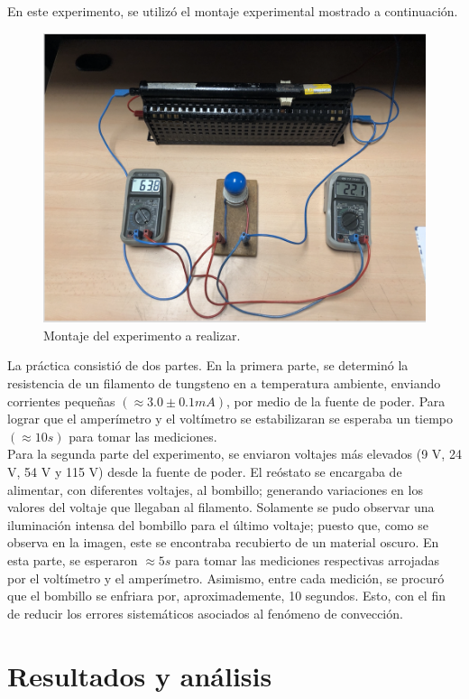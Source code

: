 \documentclass[%
 reprint,
 amsmath,amssymb,
 aps,
]{revtex4-1}
\begin{document}
En este experimento, se utilizó el montaje experimental mostrado a continuación.
\begin{figure}[H]
    \centering
    \includegraphics[scale= 0.4]{montaje_lab1.png}
    \caption{Montaje del experimento a realizar.}
    \label{fig:Figura 3}
\end{figure}

La práctica consistió de dos partes. En la primera parte, se determinó la resistencia de un filamento de tungsteno en a temperatura ambiente, enviando corrientes pequeñas $(\approx 3.0 \pm 0.1 mA)$, por medio de la fuente de poder. Para lograr que el amperímetro y el voltímetro se estabilizaran se esperaba un tiempo $(\approx 10 s)$ para tomar las mediciones. \\
Para la segunda parte del experimento, se enviaron voltajes más elevados (9 V, 24 V, 54 V y 115 V) desde la fuente de poder. El reóstato se encargaba de alimentar, con diferentes voltajes, al bombillo; generando variaciones en los valores del voltaje que llegaban al filamento. Solamente se pudo observar una iluminación intensa del bombillo para el último voltaje; puesto que, como se observa en la imagen, este se encontraba recubierto de un material oscuro. En esta parte, se esperaron $\approx 5 s$ para tomar las mediciones respectivas arrojadas por el voltímetro y el amperímetro. Asimismo, entre cada medición, se procuró que el bombillo se enfriara por, aproximademente, 10 segundos. Esto, con el fin de reducir los errores sistemáticos asociados al fenómeno de convección. 



\section{\label{sec:level1} Resultados y análisis}
\end{document}
